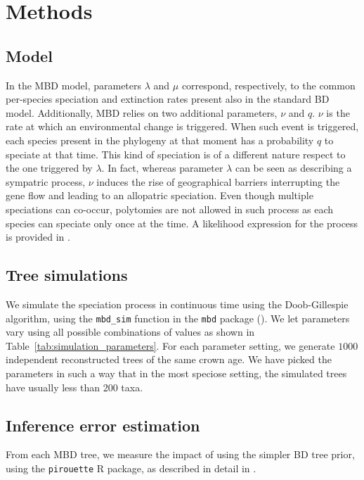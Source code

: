 \section{Methods}

\subsection{Model}

In the MBD model, parameters $\lambda$ and $\mu$ correspond, respectively, 
to the common per-species speciation and extinction rates present 
also in the standard BD model. 
Additionally, MBD relies on two additional parameters, $\nu$ and $q$. 
$\nu$ is the rate at which an environmental change is triggered.
When such event is triggered, each species present in the phylogeny at that 
moment has a probability $q$ to speciate at that time.
This kind of speciation is of a different nature respect to the one triggered 
by $\lambda$. In fact, whereas parameter $\lambda$ can be seen as describing 
a sympatric process, $\nu$ induces the rise of geographical barriers 
interrupting the gene flow and leading to an allopatric speciation.
Even though multiple speciations can co-occur, polytomies are not allowed 
in such process as each species can speciate only once at the time.
A likelihood expression for the process is provided in \cite{mbd}.

\subsection{Tree simulations}

We simulate the speciation process in continuous time using the 
Doob-Gillespie algorithm, using 
the \verb;mbd_sim; function in the \verb;mbd; package (\citep{mbd}).
We let parameters vary using all possible combinations of values
as shown in Table~\ref{tab:simulation_parameters}.
For each parameter setting, we generate $1000$ independent 
reconstructed trees of the same crown age.
We have picked the parameters in such a way that in the most speciose
setting, the simulated trees have usually less than 200 taxa.



\subsection{Inference error estimation}

From each MBD tree, we measure the impact 
of using the simpler BD tree prior, 
using the \verb;pirouette; R package, as described
in detail in \citep{pirouette}.

